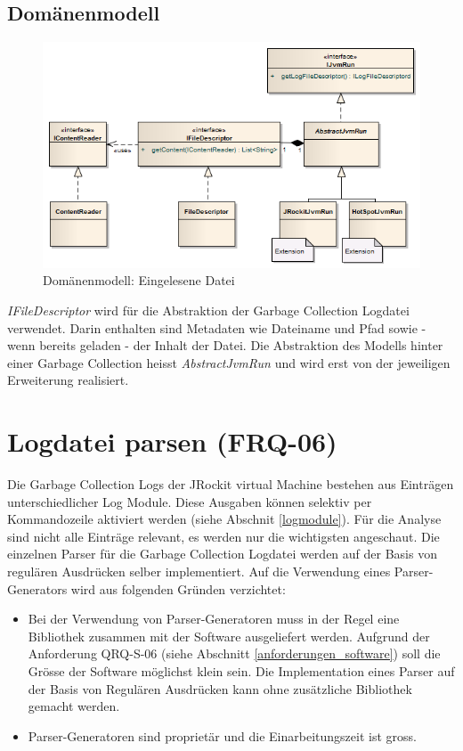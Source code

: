 \subsection{Domänenmodell}\label{logdatei_domainmodel}
 \begin{figure}[H]
  	\centering
    	\includegraphics[width=16cm]{images/core_domain}
        	\caption{Domänenmodell: Eingelesene Datei}
\end{figure}
\textit{IFileDescriptor} wird für die Abstraktion der Garbage Collection Logdatei verwendet. Darin enthalten sind Metadaten wie Dateiname und Pfad sowie - wenn bereits geladen - der Inhalt der Datei. Die Abstraktion des Modells hinter einer Garbage Collection heisst \textit{AbstractJvmRun} und wird erst von der jeweiligen Erweiterung realisiert.

\section{Logdatei parsen (FRQ-06)}
Die Garbage Collection Logs der JRockit virtual Machine bestehen aus Einträgen unterschiedlicher Log Module. Diese Ausgaben können selektiv per Kommandozeile aktiviert werden (siehe Abschnit \ref{logmodule}). Für die Analyse sind nicht alle Einträge relevant, es werden nur die wichtigsten angeschaut. Die einzelnen Parser für die Garbage Collection Logdatei werden auf der Basis von regulären Ausdrücken selber implementiert. Auf die Verwendung eines Parser-Generators wird aus folgenden Gründen verzichtet:
\begin{itemize}
	\item Bei der Verwendung von Parser-Generatoren muss in der Regel eine Bibliothek zusammen mit der Software ausgeliefert werden. Aufgrund der Anforderung QRQ-S-06 (siehe Abschnitt \ref{anforderungen_software}) soll die Grösse der Software möglichst klein sein. Die Implementation eines Parser auf der Basis von Regulären Ausdrücken kann ohne zusätzliche Bibliothek gemacht werden.
	\item Parser-Generatoren sind proprietär und die Einarbeitungszeit ist gross.
\end{itemize}


